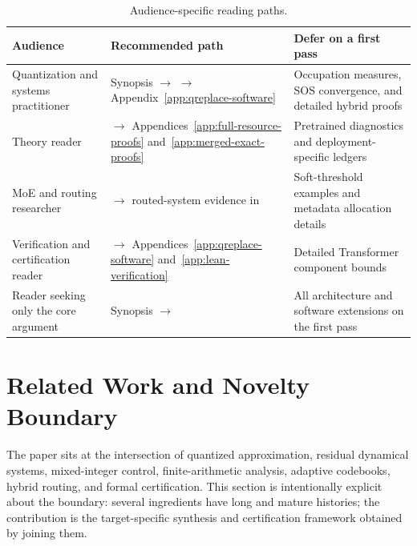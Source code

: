 \documentclass[twoside,11pt]{article}
\begin{document}
\begin{table}[t]
\centering
\caption{Audience-specific reading paths. }
\label{tab:reading-guide}
\footnotesize
\renewcommand{\arraystretch}{0.96}
\setlength{\tabcolsep}{4pt}
\begin{tabularx}{\linewidth}{@{}Y{.23\linewidth}Y{.38\linewidth}X@{}}
\toprule
Audience & Recommended path & Defer on a first pass\\
\midrule
Quantization and systems practitioner & Synopsis $\rightarrow$  $\rightarrow$ Appendix~\ref{app:qreplace-software} & Occupation measures, SOS convergence, and detailed hybrid proofs\\
Theory reader &  $\rightarrow$ Appendices~\ref{app:full-resource-proofs} and~\ref{app:merged-exact-proofs} & Pretrained diagnostics and deployment-specific ledgers\\
MoE and routing researcher &  $\rightarrow$ routed-system evidence in  & Soft-threshold examples and metadata allocation details\\
Verification and certification reader &  $\rightarrow$ Appendices~\ref{app:qreplace-software} and~\ref{app:lean-verification} & Detailed Transformer component bounds\\
Reader seeking only the core argument & Synopsis $\rightarrow$  & All architecture and software extensions on the first pass\\
\bottomrule
\end{tabularx}
\end{table}


\section{Related Work and Novelty Boundary}
\label{sec:related-work}

The paper sits at the intersection of quantized approximation, residual dynamical systems, mixed-integer control, finite-arithmetic analysis, adaptive codebooks, hybrid routing, and formal certification.  This section is intentionally explicit about the boundary: several ingredients have long and mature histories; the contribution is the target-specific synthesis and certification framework obtained by joining them.
\end{document}
